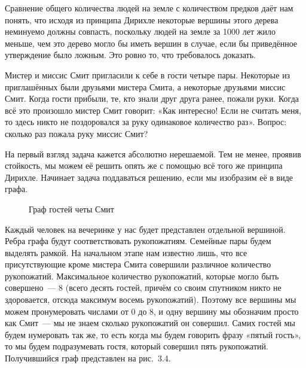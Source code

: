 \begin{example}
Сравнение общего количества людей на земле с количеством предков даёт нам понять, что исходя из принципа Дирихле некоторые вершины этого дерева неминуемо должны совпасть, поскольку людей на земле за 1000 лет жило меньше, чем это дерево могло бы иметь вершин в случае, если бы приведённое утверждение было ложным. Это ровно то, что требовалось доказать.
\end{example}

\begin{example}
Мистер и миссис Смит пригласили к себе в гости четыре пары. Некоторые из приглашённых были друзьями мистера Смита, а некоторые друзьями миссис Смит. Когда гости прибыли, те, кто знали друг друга ранее, пожали руки. Когда всё это произошло мистер Смит говорит: «Как интересно! Если не считать меня, то здесь никто не поздоровался за руку одинаковое количество раз». Вопрос: сколько раз пожала руку миссис Смит?

На первый взгляд задача кажется абсолютно нерешаемой. Тем не менее, проявив стойкость, мы можем её решить опять же с помощью всё того же принципа Дирихле. Начинает задача поддаваться решению, если мы изобразим её в виде графа.

\begin{figure}[h]
\centering
{}
\caption{Граф гостей четы Смит}
\end{figure}

Каждый человек на вечеринке у нас будет представлен отдельной вершиной. Ребра графа будут соответствовать рукопожатиям. Семейные пары будем выделять рамкой. На начальном этапе нам известно лишь, что все присутствующие кроме мистера Смита совершили различное количество рукопожатий. Максимальное количество рукопожатий, которые могло быть совершено~— 8 (всего десять гостей, причём со своим спутником никто не здоровается, отсюда максимум восемь рукопожатий). Поэтому все вершины мы можем пронумеровать числами от 0 до 8, и одну вершину мы обозначим просто как Смит~— мы не знаем сколько рукопожатий он совершил. Самих гостей мы будем нумеровать так же, то есть когда мы будем говорить фразу «пятый гость», то мы будем подразумевать гостя, который совершил пять рукопожатий. Получившийся граф представлен на рис.~3.4.


\end{example}
